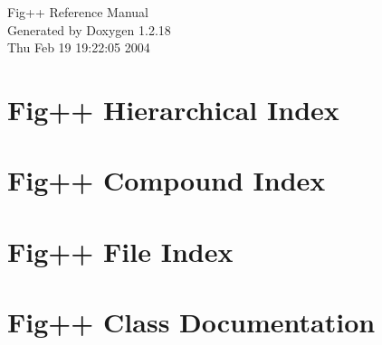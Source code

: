 \documentclass[a4paper]{book}
\begin{document}
\begin{titlepage}
\vspace*{7cm}
\begin{center}
{\Large Fig++ Reference Manual}\\
\vspace*{1cm}
{\large Generated by Doxygen 1.2.18}\\
\vspace*{0.5cm}
{\small Thu Feb 19 19:22:05 2004}\\
\end{center}
\end{titlepage}
\clearemptydoublepage
{}
\tableofcontents
\clearemptydoublepage
{}
\chapter{Fig++ Hierarchical Index}

\chapter{Fig++ Compound Index}

\chapter{Fig++ File Index}

\chapter{Fig++ Class Documentation}



























\end{document}
